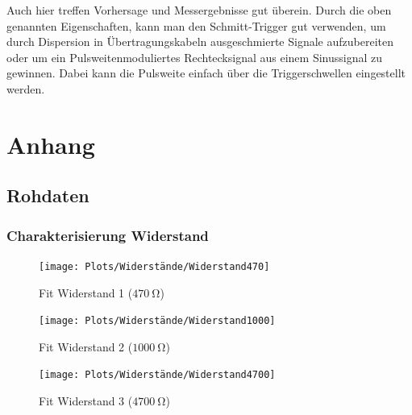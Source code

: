 \documentclass[12pt,twoside,a4paper]{scrartcl}
\begin{document}
			Auch hier treffen Vorhersage und Messergebnisse gut überein. Durch die oben genannten Eigenschaften, kann man den Schmitt-Trigger gut verwenden, um durch Dispersion in Übertragungskabeln ausgeschmierte Signale aufzubereiten oder um ein Pulsweitenmoduliertes Rechtecksignal aus einem Sinussignal zu gewinnen. Dabei kann die Pulsweite einfach über die Triggerschwellen eingestellt werden.

\newpage

\section{Anhang}
	\subsection{Rohdaten}
		\subsubsection{Charakterisierung Widerstand}
		\label{Daten::Widerstand}

			\begin{figure}[H]
				\centering
				\begin{minipage}{0.49 \textwidth}
						\texttt{[image: Plots/Widerstände/Widerstand470]}
				\caption{Fit Widerstand 1 ($\SI{470}{\ohm}$)}
				\end{minipage}
				\begin{minipage}{0.49 \textwidth}
						\texttt{[image: Plots/Widerstände/Widerstand1000]}
				\caption{Fit Widerstand 2 ($\SI{1000}{\ohm}$)}
				\end{minipage}
			\end{figure}

			\begin{figure}[H]
				\centering
				\texttt{[image: Plots/Widerstände/Widerstand4700]}
				\caption{Fit Widerstand 3 ($\SI{4700}{\ohm}$)}
		\end{figure}
\end{document}
